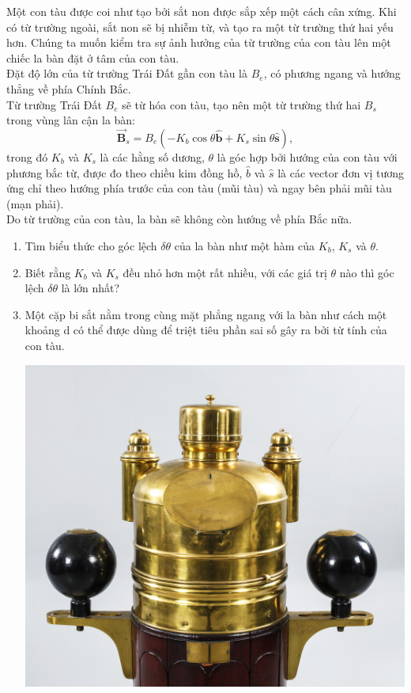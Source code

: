 \begin{vd}%
Một con tàu được coi như tạo bởi sắt non được sắp xếp một cách cân xứng. Khi có từ trường ngoài, sắt non sẽ bị nhiễm từ, và tạo ra một từ trường thứ hai yếu hơn. Chúng ta muốn kiểm tra sự ảnh hưởng của từ trường của con tàu lên một chiếc la bàn đặt ở tâm của con tàu.\\
Đặt độ lớn của từ trường Trái Đất gần con tàu là $B_e$, có phương ngang và hướng thẳng về phía Chính Bắc.\\
Từ trường Trái Đất $B_e$ sẽ từ hóa con tàu, tạo nên một từ trường thứ hai $B_s$ trong vùng lân cận la bàn:
$$\overrightarrow{\mathbf{B}}_{s}=B_{e}\left(-K_{b} \cos \theta \hat{\mathbf{b}}+K_{s} \sin \theta \hat{\mathbf{s}}\right),$$
trong đó $K_b$ và $K_s$ là các hằng số dương, $\theta$ là góc hợp bởi hướng của con tàu với phương bắc từ, được đo theo chiều kim đồng hồ, $\hat{b}$ và $\hat{s}$ là các vector đơn vị tương ứng chỉ theo hướng phía trước của con tàu (mũi tàu) và ngay bên phải mũi tàu (mạn phải).\\
Do từ trường của con tàu, la bàn sẽ không còn hướng về phía Bắc nữa.
\begin{enumerate}[1)]
    \item Tìm biểu thức cho góc lệch $\delta \theta$ của la bàn như một hàm của $K_b$, $K_s$ và $\theta$.
    \item Biết rằng $K_b$ và $K_s$ đều nhỏ hơn một rất nhiều, với các giá trị $\theta$ nào thì góc lệch $\delta\theta$ là lớn nhất?
    \item Một cặp bi sắt nằm trong cùng mặt phẳng ngang với la bàn như cách một khoảng d có thể được dùng để triệt tiêu phần sai số gây ra bởi từ tính của con tàu.\\
\begin{center}
    \includegraphics[scale=0.3]{Anh/ngoc2.jpg}
\end{center}


\end{enumerate}
\end{vd}
